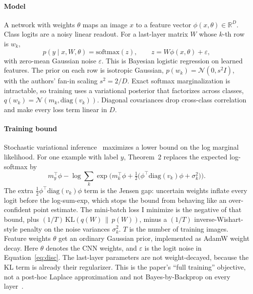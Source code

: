 \documentclass[11pt,a4paper]{article}
\begin{document}
\paragraph{Model}
A network with weights $\theta$ maps an image $x$ to a feature vector $\phi(x,\theta)\in\mathbb{R}^{D}$.
Class logits are a noisy linear readout. For a last-layer matrix $W$ whose $k$-th row is $w_k$,
\begin{equation}
p(y\mid x,W,\theta)=\mathrm{softmax}(z),\qquad
z = W\phi(x,\theta)+\varepsilon,
\label{eq:disc}
\end{equation}
with zero-mean Gaussian noise $\varepsilon$.
This is Bayesian logistic regression on learned features.
The prior on each row is isotropic Gaussian, $p(w_k)=\mathcal{N}(0, s^{2}I)$, with the authors' fan-in scaling $s^{2}=2/D$.
Exact softmax marginalization is intractable, so training uses a variational posterior that factorizes across classes,
$q(w_k)=\mathcal{N}(m_k,\mathrm{diag}(v_k))$.
Diagonal covariances drop cross-class correlation and make every loss term linear in $D$.

\paragraph{Training bound}
Stochastic variational inference~\cite{hoffman2013svi} maximizes a lower bound on the log marginal likelihood.
For one example with label $y$, Theorem~2 replaces the expected log-softmax by
\begin{equation}
m_y^{\top}\phi
- \log\sum_{k}\exp\!\Big(m_k^{\top}\phi
+ \tfrac12\big(\phi^{\top}\mathrm{diag}(v_k)\phi+\sigma_k^{2}\big)\Big).
\label{eq:bound}
\end{equation}
The extra $\tfrac12\phi^{\top}\mathrm{diag}(v_k)\phi$ term is the Jensen gap: uncertain weights inflate every logit before the log-sum-exp, which stops the bound from behaving like an over-confident point estimate.
The mini-batch loss I minimize is the negative of that bound, plus $(1/T)\,\mathrm{KL}(q(W)\,\|\,p(W))$, minus a $(1/T)$ inverse-Wishart-style penalty on the noise variances $\sigma_k^{2}$.
$T$ is the number of training images.
Feature weights $\theta$ get an ordinary Gaussian prior, implemented as AdamW weight decay.
Here $\theta$ denotes the CNN weights, and $\varepsilon$ is the logit noise in Equation~\eqref{eq:disc}.
The last-layer parameters are not weight-decayed, because the KL term is already their regularizer.
This is the paper's ``full training'' objective, not a post-hoc Laplace approximation and not Bayes-by-Backprop on every layer~\cite{blundell2015weight}.
\end{document}
